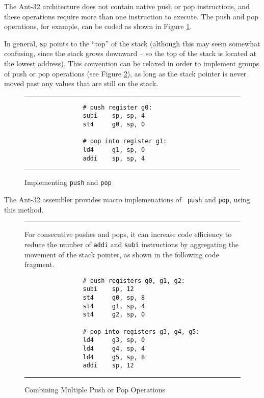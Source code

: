 	The Ant-32 architecture does not contain native push or pop
	instructions, and these operations require more than one
	instruction to execute.  The push and pop operations, for
	example, can be coded as shown in Figure
	\ref{simple-push-pop}.

	In general, {\tt sp} points to the ``top'' of the stack
	(although this may seem somewhat confusing, since the stack
	grows downward -- so the top of the stack is located at the lowest
	address).  This convention can be relaxed in order to
	implement groups of push or pop operations (see Figure
	\ref{combined-push-pop}), as long as the stack pointer is
	never moved past any values that are still on the stack.


	\begin{figure}
	\hrule
	\caption{\label{simple-push-pop}
			Implementing {\tt push} and {\tt pop}}

        \begin{verbatim}
                # push register g0:
                subi    sp, sp, 4
                st4     g0, sp, 0

                # pop into register g1:
                ld4     g1, sp, 0
                addi    sp, sp, 4
        \end{verbatim}
	\hrule
	\end{figure}

	The Ant-32 assembler provides macro implemenations of {\tt
	push} and {\tt pop}, using this method.

	\begin{figure}
	\hrule
	\caption{\label{combined-push-pop}
			Combining Multiple Push or Pop Operations}
			\vspace{3mm}

	For consecutive pushes and pops, it can increase code
	efficiency to reduce the number of {\tt addi} and {\tt subi}
	instructions by aggregating the movement of the stack pointer,
	as shown in the following code fragment.

	\begin{verbatim}
                # push registers g0, g1, g2:
                subi    sp, 12
                st4     g0, sp, 8
                st4     g1, sp, 4
                st4     g2, sp, 0

                # pop into registers g3, g4, g5:
                ld4     g3, sp, 0
                ld4     g4, sp, 4
                ld4     g5, sp, 8
                addi    sp, 12
        \end{verbatim}
	\hrule
	\end{figure}


